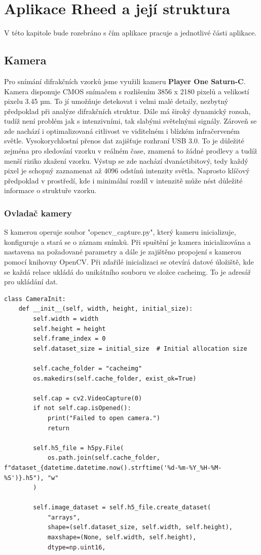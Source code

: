 \documentclass{article}
\begin{document}
\section{Aplikace Rheed a její struktura}
    V této kapitole bude rozebráno s čím aplikace pracuje a jednotlivé části aplikace.
\subsection{Kamera}
Pro snímání difrakčních vzorků jsme využili kameru \textbf{Player One Saturn-C}. Kamera disponuje CMOS snímačem s rozlišením 3856 x 2180 pixelů a velikostí pixelu 3.45 µm. To jí umožňuje detekovat i velmi malé detaily, nezbytný předpoklad při analýze difrakčních struktur.
    Dále má široký dynamický rozsah, tudíž není problém jak s intenzivními, tak slabými světelnými signály. Zároveň se zde nachází i optimalizovaná citlivost ve viditelném i blízkém infračerveném světle.
    Vysokorychlostní přenos dat zajišťuje rozhraní USB 3.0. To je důležité zejména pro sledování vzorku v reálném čase, znamená to žádné prodlevy a tudíž menší riziko zkažení vzorku.
    Výstup se zde nachází dvanáctibitový, tedy každý pixel je schopný zaznamenat až 4096 odstínů intenzity světla. Naprosto klíčový předpoklad v prostředí, kde i minimální rozdíl v intenzitě může nést důležité informace o struktuře vzorku.
\newpage
\subsubsection{Ovladač kamery}
S kamerou operuje soubor "opencv\_capture.py", který kameru inicializuje, konfiguruje a stará se o záznam snímků. Při spuštění je kamera inicializována a nastavena na požadované parametry a dále je zajištěno propojení s kamerou pomocí knihovny OpenCV. Při zdařilé inicializaci se otevírá datové úložiště, kde se každá relace ukládá do unikátního souboru ve složce cacheimg. To je adresář pro ukládání dat.\\

\begin{lstlisting}
class CameraInit:
    def __init__(self, width, height, initial_size):
        self.width = width
        self.height = height
        self.frame_index = 0
        self.dataset_size = initial_size  # Initial allocation size
        
        self.cache_folder = "cacheimg"
        os.makedirs(self.cache_folder, exist_ok=True)
        
        self.cap = cv2.VideoCapture(0)
        if not self.cap.isOpened():
            print("Failed to open camera.")
            return
        
        self.h5_file = h5py.File(
            os.path.join(self.cache_folder, f"dataset_{datetime.datetime.now().strftime('%d-%m-%Y_%H-%M-%S')}.h5"), "w"
        )

        self.image_dataset = self.h5_file.create_dataset(
            "arrays",
            shape=(self.dataset_size, self.width, self.height),
            maxshape=(None, self.width, self.height),
            dtype=np.uint16,
\end{lstlisting}
\vspace{0.5cm}
\end{document}
